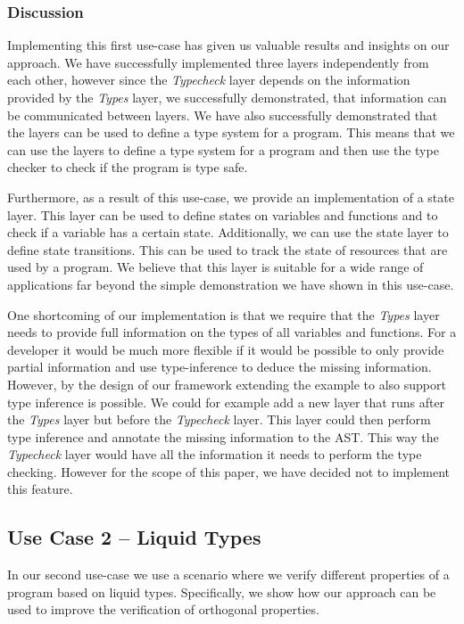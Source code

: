 \subsubsection{Discussion}

Implementing this first use-case has given us valuable results and insights on our approach. We have successfully implemented three layers independently from each other, however since the \textit{Typecheck} layer depends on the information provided by the \textit{Types} layer, we successfully demonstrated, that information can be communicated between layers. We have also successfully demonstrated that the layers can be used to define a type system for a program. This means that we can use the layers to define a type system for a program and then use the type checker to check if the program is type safe.

Furthermore, as a result of this use-case, we provide an implementation of a state layer. This layer can be used to define states on variables and functions and to check if a variable has a certain state. Additionally, we can use the state layer to define state transitions. This can be used to track the state of resources that are used by a program. We believe that this layer is suitable for a wide range of applications far beyond the simple demonstration we have shown in this use-case.

One shortcoming of our implementation is that we require that the \textit{Types} layer needs to provide full information on the types of all variables and functions. For a developer it would be much more flexible if it would be possible to only provide partial information and use type-inference to deduce the missing information. However, by the design of our framework extending the example to also support type inference is possible. We could for example add a new layer that runs after the \textit{Types} layer but before the \textit{Typecheck} layer. This layer could then perform type inference and annotate the missing information to the AST. This way the \textit{Typecheck} layer would have all the information it needs to perform the type checking. However for the scope of this paper, we have decided not to implement this feature.

\subsection{Use Case 2 -- Liquid Types}
\label{sssec:use_case_2}

In our second use-case we use a scenario where we verify different properties of a program based on liquid types. Specifically, we show how our approach can be used to improve the verification of orthogonal properties.


